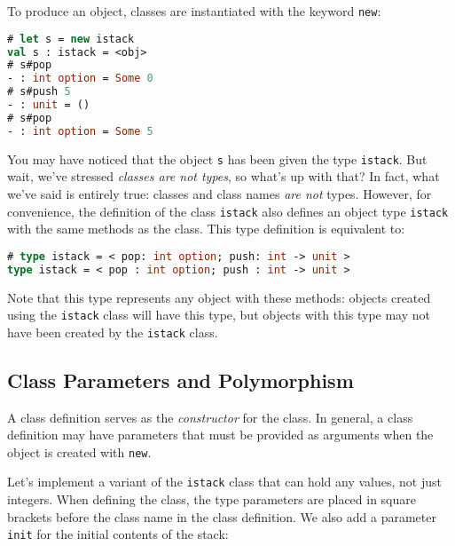 To produce an object, classes are instantiated with the keyword
\passthrough{\lstinline!new!}:

\begin{lstlisting}[language=Caml]
# let s = new istack
val s : istack = <obj>
# s#pop
- : int option = Some 0
# s#push 5
- : unit = ()
# s#pop
- : int option = Some 5
\end{lstlisting}

You may have noticed that the object \passthrough{\lstinline!s!} has
been given the type \passthrough{\lstinline!istack!}. But wait, we've
stressed \emph{classes are not types}, so what's up with that? In fact,
what we've said is entirely true: classes and class names \emph{are not}
types. However, for convenience, the definition of the class
\passthrough{\lstinline!istack!} also defines an object type
\passthrough{\lstinline!istack!} with the same methods as the class.
This type definition is equivalent to:

\begin{lstlisting}[language=Caml]
# type istack = < pop: int option; push: int -> unit >
type istack = < pop : int option; push : int -> unit >
\end{lstlisting}

Note that this type represents any object with these methods: objects
created using the \passthrough{\lstinline!istack!} class will have this
type, but objects with this type may not have been created by the
\passthrough{\lstinline!istack!} class.

\hypertarget{class-parameters-and-polymorphism}{%
\subsection{Class Parameters and
Polymorphism}\label{class-parameters-and-polymorphism}}

A class definition serves as the \emph{constructor} for the class. In
general, a class definition may have parameters that must be provided as
arguments when the object is created with \passthrough{\lstinline!new!}.

Let's implement a variant of the \passthrough{\lstinline!istack!} class
that can hold any values, not just integers. When defining the class,
the type parameters are placed in square brackets before the class name
in the class definition. We also add a parameter
\passthrough{\lstinline!init!} for the initial contents of the stack:

